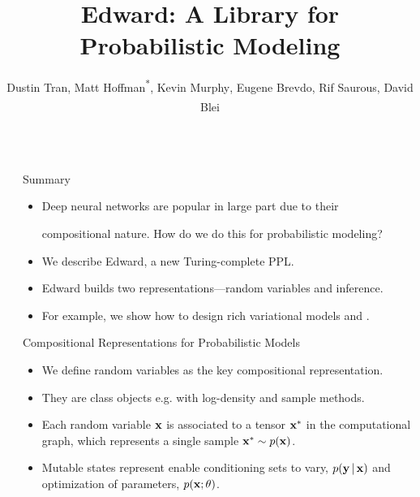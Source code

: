 \documentclass[final]{beamer}
\title{Edward: A Library for Probabilistic Modeling}
\author{Dustin Tran\textsuperscript{\textdagger},
Matt Hoffman\textsuperscript{*}\textsuperscript{\ddag},
Kevin Murphy\textsuperscript{\ddag},
Eugene Brevdo\textsuperscript{\ddag},
Rif Saurous\textsuperscript{\ddag},
David Blei\textsuperscript{\textdagger}}
\institute{
\textsuperscript{\textdagger}Columbia University,
\textsuperscript{*}Adobe Research,
\textsuperscript{\ddag}Google
}
\begin{document}
\begin{frame}[t]
\begin{columns}[t]

\begin{column}{\sepwid}\end{column} %

\begin{column}{\onecolwid}

\begin{alertblock}{Summary}
\begin{itemize}
  \item
Deep neural networks are popular in large part due to their

compositional nature. How do we do this for
probabilistic modeling?
  \item We describe
Edward, a new Turing-complete \acrlong{PPL}.
\item Edward builds
two representations---random variables and
inference.
\item
For example, we show how to design rich variational models and .
\end{itemize}
\end{alertblock}

\begin{block}{Compositional Representations for Probabilistic Models}
\begin{itemize}
\item
We define random variables as the key compositional representation.
\item
They are class objects e.g. with log-density and sample methods.
\item
Each random variable $\boldsymbol{\mathbf{x}}$ is associated to a
tensor $\boldsymbol{\mathbf{x}}^*$ in the computational graph, which represents a single
sample $\boldsymbol{\mathbf{x}}^*\sim p(\boldsymbol{\mathbf{x}})$.
\item
Mutable states represent enable conditioning sets to vary,
$p(\boldsymbol{\mathbf{y}}\,|\,\boldsymbol{\mathbf{x}})$ and optimization of parameters, $p(\boldsymbol{\mathbf{x}}; \theta)$.
\end{itemize}
\end{block}


\end{column}
\end{columns}
\end{frame}
\end{document}
